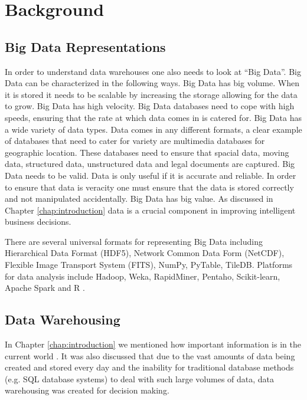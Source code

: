 %
%
%
%
%
\chapter{Background} \label{chap:background}
\vspace{-1cm}

\section{Big Data Representations}
In order to understand data warehouses one also needs to look at ``Big Data''. Big Data can be characterized in the following ways. Big Data has big volume. When it is stored it needs to be scalable by increasing the storage allowing for the data to grow. Big Data has high velocity. Big Data databases need to cope with high speeds, ensuring that the rate at which data comes in is catered for. Big Data has a wide variety of data types. Data comes in any different formats, a clear example of databases that need to cater for variety are multimedia databases for geographic location. These databases need to ensure that spacial data, moving data, structured data, unstructured data and legal documents are captured. Big Data needs to be valid. Data is only useful if it is accurate and reliable. In order to ensure that data is veracity one must ensure that the data is stored correctly and not manipulated accidentally. Big Data has big value. As discussed in Chapter \ref{chap:introduction} data is a crucial component in improving intelligent business decisions.

There are several universal formats for representing Big Data including Hierarchical Data Format (HDF5), Network Common Data Form (NetCDF), Flexible Image Transport System (FITS), NumPy, PyTable, TileDB. Platforms for data analysis include Hadoop, Weka, RapidMiner, Pentaho, Scikit-learn, Apache Spark and R \cite{tiledb:tm101}.

\section{Data Warehousing}
In Chapter \ref{chap:introduction} we mentioned how important information is in the current world \cite{golfarelli:2009:dwd}. It was also discussed that due to the vast amounts of data being created and stored every day and the inability for traditional database methods (e.g. SQL database systems) to deal with such large volumes of data, data warehousing was created for decision making.

